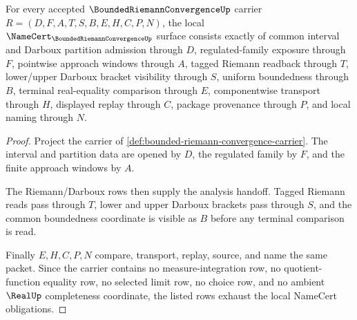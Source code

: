 \begin{theorem}
\label{thm:bounded-riemann-convergence-namecert-obligations}
For every accepted $\BoundedRiemannConvergenceUp$ carrier $R=(D,F,A,T,S,B,E,H,C,P,N)$, the local $\NameCert_{\BoundedRiemannConvergenceUp}$ surface consists exactly of common interval and Darboux partition admission through $D$, regulated-family exposure through $F$, pointwise approach windows through $A$, tagged Riemann readback through $T$, lower/upper Darboux bracket visibility through $S$, uniform boundedness through $B$, terminal real-equality comparison through $E$, componentwise transport through $H$, displayed replay through $C$, package provenance through $P$, and local naming through $N$.
\end{theorem}
\begin{proof}
Project the carrier of \autoref{def:bounded-riemann-convergence-carrier}. The interval and partition data are opened by $D$, the regulated family by $F$, and the finite approach windows by $A$.

The Riemann/Darboux rows then supply the analysis handoff. Tagged Riemann reads pass through $T$, lower and upper Darboux brackets pass through $S$, and the common boundedness coordinate is visible as $B$ before any terminal comparison is read.

Finally $E,H,C,P,N$ compare, transport, replay, source, and name the same packet. Since the carrier contains no measure-integration row, no quotient-function equality row, no selected limit row, no choice row, and no ambient $\RealUp$ completeness coordinate, the listed rows exhaust the local NameCert obligations.
\end{proof}

